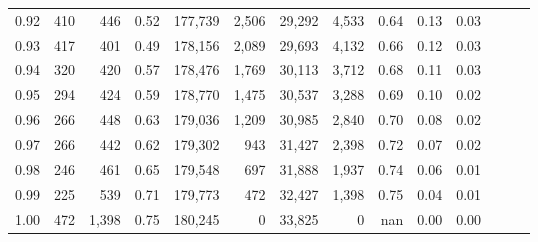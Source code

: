 \begin{tabular}{rrrrrrrrrrrrrr}
0.92 &    410 &    446 &  0.52 &  177,739 &    2,506 &  29,292 &   4,533 &  0.64 &  0.13 &      0.03 \\
0.93 &    417 &    401 &  0.49 &  178,156 &    2,089 &  29,693 &   4,132 &  0.66 &  0.12 &      0.03 \\
0.94 &    320 &    420 &  0.57 &  178,476 &    1,769 &  30,113 &   3,712 &  0.68 &  0.11 &      0.03 \\
0.95 &    294 &    424 &  0.59 &  178,770 &    1,475 &  30,537 &   3,288 &  0.69 &  0.10 &      0.02 \\
0.96 &    266 &    448 &  0.63 &  179,036 &    1,209 &  30,985 &   2,840 &  0.70 &  0.08 &      0.02 \\
0.97 &    266 &    442 &  0.62 &  179,302 &      943 &  31,427 &   2,398 &  0.72 &  0.07 &      0.02 \\
0.98 &    246 &    461 &  0.65 &  179,548 &      697 &  31,888 &   1,937 &  0.74 &  0.06 &      0.01 \\
0.99 &    225 &    539 &  0.71 &  179,773 &      472 &  32,427 &   1,398 &  0.75 &  0.04 &      0.01 \\
1.00 &    472 &  1,398 &  0.75 &  180,245 &        0 &  33,825 &       0 &   nan &  0.00 &      0.00 \\
\bottomrule
\end{tabular}
